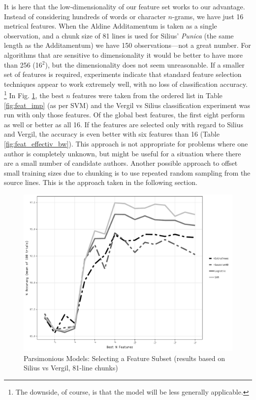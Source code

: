 \documentclass[11pt,a4paper]{scrartcl} %
\begin{document}
{It is here that the low-dimensionality of our feature set works to our advantage. Instead of considering hundreds of words or character $n$-grams, we have just 16 metrical features. When the Aldine Additamentum is taken as a single observation, and a chunk size of 81 lines is used for Silius' \textit{Punica} (the same length as the Additamentum) we have 150 observations---not a great number. For algorithms that are sensitive to dimensionality it would be better to have more than 256 (16$^{2}$), but the dimensionality does not seem unreasonable. If a smaller set of features is required, experiments indicate that standard feature selection techniques appear to work extremely well, with no loss of classification accuracy.%
\footnote{The downside, of course, is that the model will be less generally applicable.}
In Fig. \ref{fig:glob_feat_sel}, the best $n$ features were taken from the ordered list in Table \ref{fig:feat_imp} (as per SVM) and the Vergil vs Silius classification experiment was run with only those features. Of the global best features, the first eight perform as well or better as all 16. If the features are selected only with regard to Silius and Vergil, the accuracy is even better with six features than 16 (Table \ref{fig:feat_effectiv_bw}). This approach is not appropriate for problems where one author is completely unknown, but might be useful for a situation where there are a small number of candidate authors. Another possible approach to offset small training sizes due to chunking is to use repeated random sampling from the source lines. This is the approach taken in the following section.

\begin{figure}
    \caption{Parsimonious Models: Selecting a Feature Subset (results based on Silius vs Vergil, 81-line chunks)}
    \label{fig:glob_feat_sel}
    \includegraphics[width=\textwidth]{feat_reduction.pdf}
\end{figure}

}
\end{document}
